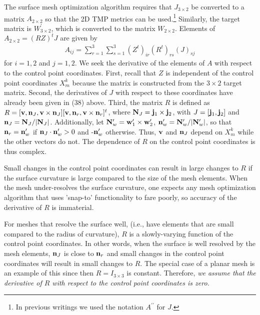  \newline
The surface mesh optimization algorithm requires that $J_{3 \times 2}$ be 
converted to a matrix $A_{2 \times 2}$ so that the 2D TMP metrics can be 
used.\footnote{In previous writings we used the notation $A^{\prime\prime}$ for $J$.} Similarly, the target matrix is $W^\prime_{3 \times 2}$, which is converted to the matrix $W_{2 \times 2}$. Elements of $A_{2 \times 2}=(RZ)^t J$ 
are given by
\begin{eqnarray}
A_{ij} = \sum_{r=1}^3 \sum_{s=1}^3 \left( Z^t \right)_{ir} \left( R^t \right)_{rs} \left( J \right)_{sj}
\end{eqnarray}
for $i=1,2$ and $j=1,2$. We seek the derivative of the elements of $A$ with
respect to the control point coordinates. 
First, recall that $Z$ is independent of the control
point coordinates $X_m^k$ because the matrix is constructed from the 
$3 \times 2$ target matrix.  Second, the derivatives of $J$ with respect to
these coordinates have already been given in (38) above.  Third, the matrix $R$ is 
defined as $R = [{\bf v},{\bf n}_J,{\bf v} \times {\bf n}_J][{\bf v},{\bf n}_r,{\bf v} \times {\bf n}_r]^t$, where ${\bf N}_J = {\bf j}_1 \times {\bf j}_2$, 
with $J= [{\bf j}_1,{\bf j}_2]$ and ${\bf n}_J={\bf N}_J/|{\bf N}_J|$.
Additionally, let ${\bf N}_w^\prime = {\bf w}_1^\prime \times {\bf w}_2^\prime$, ${\bf n}_w^\prime = {\bf N}_w^\prime/|{\bf N}_w^\prime|$, so that 
${\bf n}_r = {\bf n}_w^\prime$ if ${\bf n}_J \cdot {\bf n}_w^\prime>0$ and 
-${\bf n}_w^\prime$ otherwise. Thus, ${\bf v}$ and ${\bf n}_J$ depend on 
$X_m^k$ while the other vectors do not. The dependence of $R$ on the control
point coordinates is thus complex. \newline

\noindent Small changes in the control point coordinates can result in large 
changes to $R$ if the surface curvature is large compared to the size
of the mesh elements. When the mesh under-resolves the surface curvature, 
one expects any mesh optimization algorithm that uses 'snap-to' 
functionality to fare poorly, so accuracy of the derivative of $R$ is  
immaterial.  \newline
 
\noindent For meshes that resolve the 
surface well, (i.e., have elements that are small compared to the radius of 
curvature), $R$ is a slowly-varying function of the 
control point coordinates.  In other words, when the surface is well resolved 
by the mesh elements, ${\bf n}_J$ is close to ${\bf n}_r$ and small
changes in the control point coordinates will result in small changes to $R$. 
The special case of a planar mesh is an example of this since then 
$R=I_{3 \times 3}$ is constant. Therefore, {\it we assume that the derivative 
of $R$ with respect to the control point coordinates is zero.} \newline

